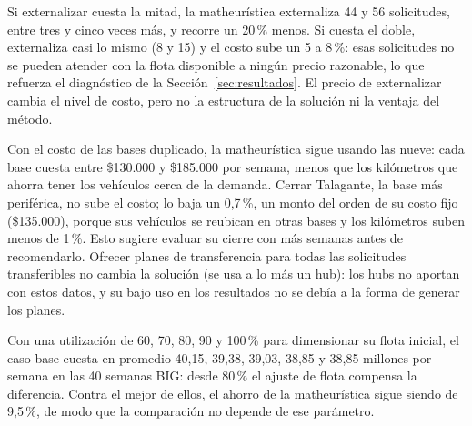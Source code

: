  Si externalizar cuesta la mitad, la matheurística externaliza 44 y 56 solicitudes, entre tres y cinco veces más, y recorre un 20\,\% menos. Si cuesta el doble, externaliza casi lo mismo (8 y 15) y el costo sube un 5 a 8\,\%: esas solicitudes no se pueden atender con la flota disponible a ningún precio razonable, lo que refuerza el diagnóstico de la Sección~\ref{sec:resultados}. El precio de externalizar cambia el nivel de costo, pero no la estructura de la solución ni la ventaja del método.

 Con el costo de las bases duplicado, la matheurística sigue usando las nueve: cada base cuesta entre \$130.000 y \$185.000 por semana, menos que los kilómetros que ahorra tener los vehículos cerca de la demanda. Cerrar Talagante, la base más periférica, no sube el costo; lo baja un 0,7\,\%, un monto del orden de su costo fijo (\$135.000), porque sus vehículos se reubican en otras bases y los kilómetros suben menos de 1\,\%. Esto sugiere evaluar su cierre con más semanas antes de recomendarlo. Ofrecer planes de transferencia para todas las solicitudes transferibles no cambia la solución (se usa a lo más un hub): los hubs no aportan con estos datos, y su bajo uso en los resultados no se debía a la forma de generar los planes.

 Con una utilización de 60, 70, 80, 90 y 100\,\% para dimensionar su flota inicial, el caso base cuesta en promedio 40,15, 39,38, 39,03, 38,85 y 38,85 millones por semana en las 40 semanas BIG: desde 80\,\% el ajuste de flota compensa la diferencia. Contra el mejor de ellos, el ahorro de la matheurística sigue siendo de 9,5\,\%, de modo que la comparación no depende de ese parámetro.
